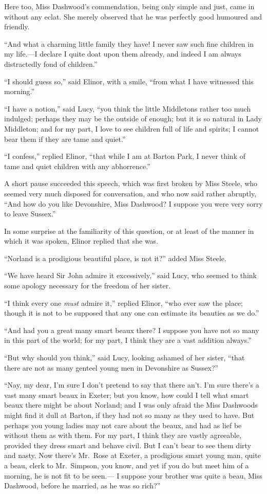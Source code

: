 \documentclass{article}
\begin{document}
Here too, Miss Dashwood's commendation, being only
simple and just, came in without any eclat.  She merely
observed that he was perfectly good humoured and friendly.

``And what a charming little family they have!  I
never saw such fine children in my life.---I declare I
quite doat upon them already, and indeed I am always
distractedly fond of children.''

``I should guess so,'' said Elinor, with a smile,
``from what I have witnessed this morning.''

``I have a notion,'' said Lucy, ``you think the little
Middletons rather too much indulged; perhaps they may be the
outside of enough; but it is so natural in Lady Middleton;
and for my part, I love to see children full of life
and spirits; I cannot bear them if they are tame and quiet.''

``I confess,'' replied Elinor, ``that while I am at
Barton Park, I never think of tame and quiet children
with any abhorrence.''

A short pause succeeded this speech, which was first
broken by Miss Steele, who seemed very much disposed
for conversation, and who now said rather abruptly,
``And how do you like Devonshire, Miss Dashwood?  I suppose
you were very sorry to leave Sussex.''

In some surprise at the familiarity of this question,
or at least of the manner in which it was spoken,
Elinor replied that she was.

``Norland is a prodigious beautiful place, is not it?''
added Miss Steele.

``We have heard Sir John admire it excessively,''
said Lucy, who seemed to think some apology necessary
for the freedom of her sister.

``I think every one \emph{must} admire it,'' replied Elinor,
``who ever saw the place; though it is not to be supposed
that any one can estimate its beauties as we do.''

``And had you a great many smart beaux there?  I
suppose you have not so many in this part of the world;
for my part, I think they are a vast addition always.''

``But why should you think,'' said Lucy, looking ashamed
of her sister, ``that there are not as many genteel young
men in Devonshire as Sussex?''

``Nay, my dear, I'm sure I don't pretend to say that there
an't.  I'm sure there's a vast many smart beaux in Exeter;
but you know, how could I tell what smart beaux there
might be about Norland; and I was only afraid the Miss
Dashwoods might find it dull at Barton, if they had not
so many as they used to have.  But perhaps you young ladies
may not care about the beaux, and had as lief be without
them as with them.  For my part, I think they are vastly
agreeable, provided they dress smart and behave civil.
But I can't bear to see them dirty and nasty.  Now there's
Mr.\ Rose at Exeter, a prodigious smart young man,
quite a beau, clerk to Mr.\ Simpson, you know, and yet if you
do but meet him of a morning, he is not fit to be seen.---%
I suppose your brother was quite a beau, Miss Dashwood,
before he married, as he was so rich?''
\end{document}
